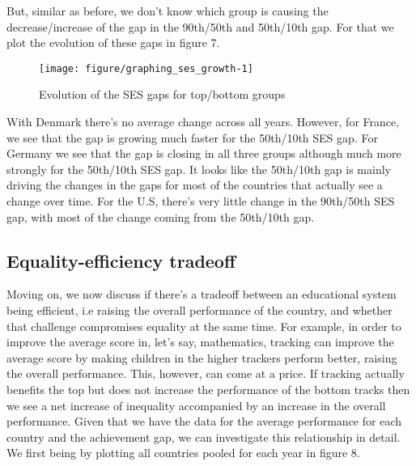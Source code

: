 \documentclass[11pt, a4paper]{article}\usepackage[]{graphicx}\usepackage[]{color}
\begin{document}
But, similar as before, we don't know which group is causing the decrease/increase of the gap in the 90th/50th and 50th/10th gap. For that we plot the evolution of these gaps in figure 7.

\begin{figure}

{\centering \texttt{[image: figure/graphing\_ses\_growth-1]} 

}

\caption[Evolution of the SES gaps for top/bottom groups]{Evolution of the SES gaps for top/bottom groups}\label{fig:graphing_ses_growth}
\end{figure}



With Denmark there's no average change across all years. However, for France, we see that the gap is growing much faster for the 50th/10th SES gap. For Germany we see that the gap is closing in all three groups although much more strongly for the 50th/10th SES gap. It looks like the 50th/10th gap is mainly driving the changes in the gaps for most of the countries that actually see a change over time.  For the U.S, there's very little change in the 90th/50th SES gap, with most of the change coming from the 50th/10th gap.

\subsection{Equality-efficiency tradeoff}

Moving on, we now discuss if there's a tradeoff between an educational system being efficient, i.e raising the overall performance of the country, and whether that challenge compromises equality at the same time. For example, in order to improve the average score in, let's say, mathematics, tracking can improve the average score by making children in the higher trackers perform better, raising the overall performance. This, however, can come at a price. If tracking actually benefits the top but does not increase the performance of the bottom tracks then we see a net increase of inequality accompanied by an increase in the overall performance. Given that we have the data for the average performance for each country and the achievement gap, we can investigate this relationship in detail. We first being by plotting all countries pooled for each year in figure 8.
\end{document}
